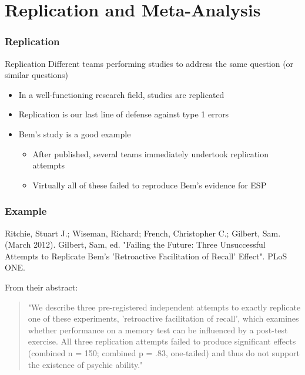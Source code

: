 \documentclass[10pt, block=fill]{beamer}
\begin{document}
\section{Replication and Meta-Analysis}

\begin{frame}
    \frametitle{Replication}
    
    \begin{block}{Replication}
        Different teams performing studies to address the same question (or similar questions)
    \end{block}
    
    \begin{itemize}
        \item In a well-functioning research field, studies are replicated
        \item Replication is our last line of defense against type 1 errors
        \item Bem's study is a good example
        \begin{itemize}
            \item After published, several teams immediately undertook replication attempts
            \item Virtually all of these failed to reproduce Bem's evidence for ESP
        \end{itemize}
    \end{itemize}
    
\end{frame}

\begin{frame}
    \frametitle{Example}
    
    Ritchie, Stuart J.; Wiseman, Richard; French, Christopher C.; Gilbert, Sam. (March 2012). Gilbert, Sam, ed. "Failing the Future: Three Unsuccessful Attempts to Replicate Bem's 'Retroactive Facilitation of Recall' Effect". PLoS ONE.
    
    \vspace{0.25in}
    
    From their abstract:
    \begin{quote}
        "We describe three pre-registered independent attempts to exactly replicate one of these experiments, 'retroactive facilitation of recall', which examines whether performance on a memory test can be influenced by a post-test exercise. All three replication attempts failed to produce significant effects (combined n = 150; combined p = .83, one-tailed) and thus do not support the existence of psychic ability."
    \end{quote}
    
\end{frame}
\end{document}
